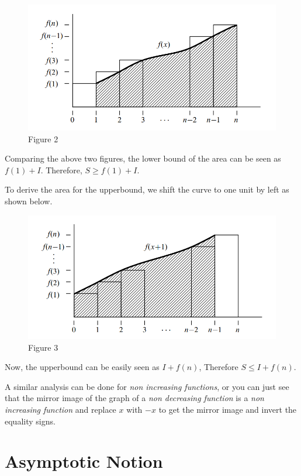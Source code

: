 \documentclass{article}
\begin{document}
\begin{figure}[h!]
    \includegraphics[width=\linewidth]{resources/13_2.png}
    \caption{Figure 2}
    \label{fig:p2}
\end{figure}

Comparing the above two figures, the lower bound of the area can be seen as $f(1) + I$. Therefore, $S \ge f(1) + I$.

To derive the area for the upperbound, we shift the curve to one unit by left as shown below.

\begin{figure}[h!]
    \includegraphics[width=\linewidth]{resources/13_3.png}
    \caption{Figure 3}
    \label{fig:p3}
\end{figure}

Now, the upperbound can be easily seen as $I + f(n)$, Therefore $S \le I + f(n)$. 

A similar analysis can be done for \textit{non increasing functions}, or you can just see that the mirror image of the graph of a \textit{non decreasing function} is a \textit{non increasing function} and replace $x$ with $-x$ to get the mirror image and invert the equality signs.

\section{Asymptotic Notion}
\end{document}
